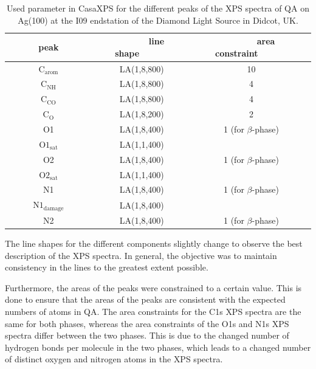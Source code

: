 \begin{table}[H]
	\centering
	\caption{Used parameter in CasaXPS\autocite{CasaSoftwareLtd2022} for the different peaks of the \ac{XPS} spectra of \ac{QA} on Ag(100) at the I09 endstation of the Diamond Light Source in Didcot, UK.}
\begin{tabular}{|c|c|c|}
	\hline
	~~~~~~peak~~~~~~ & ~~~~~~line shape~~~~~~ & ~~~~~~area constraint~~~~~~ \\
	\hline
	$\mathrm{C_{arom}}$ & LA(1,8,800) & 10 \\
	\hline
	$\mathrm{C_{NH}}$ & LA(1,8,800) & 4 \\
	\hline
	$\mathrm{C_{CO}}$ & LA(1,8,800) & 4 \\
	\hline
	$\mathrm{C_{O}}$ & LA(1,8,200) & 2 \\
	\hline \hline
	O1 & LA(1,8,400) & 1 (for $\beta$-phase) \\
	\hline
	$\mathrm{O1_{sat}}$ & LA(1,1,400) &  \\
	\hline
	O2 & LA(1,8,400) & 1 (for $\beta$-phase) \\
	\hline
	$\mathrm{O2_{sat}}$  & LA(1,1,400) &  \\
	\hline \hline
	N1 & LA(1,8,400) & 1 (for $\beta$-phase) \\
	\hline
	$\mathrm{N1_{damage}}$  & LA(1,8,400) &  \\
	\hline
	N2 & LA(1,8,400) & 1 (for $\beta$-phase) \\
	\hline
\end{tabular}
	\label{tab:casa}
\end{table}

The line shapes for the different components slightly change to observe the best description of the \ac{XPS} spectra. In general, the objective was to maintain consistency in the lines to the greatest extent possible.

Furthermore, the areas of the peaks were constrained to a certain value. This is done to ensure that the areas of the peaks are consistent with the expected numbers of atoms in \ac{QA}. The area constraints for the C1s \ac{XPS} spectra are the same for both phases, whereas the area constraints of the O1s and N1s \ac{XPS} spectra differ between the two phases. This is due to the changed number of hydrogen bonds per molecule in the two phases, which leads to a changed number of distinct oxygen and nitrogen atoms in the \ac{XPS} spectra.

\cleardoublepage

